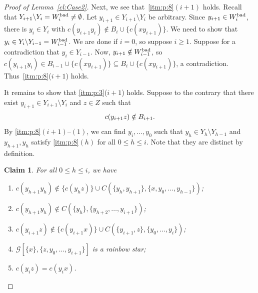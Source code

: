 \documentclass[a4paper, 12pt]{article}
\numberwithin{equation}{section}
\newtheorem{claim}[theorem]{Claim}
\def\sm{{\setminus}}
\newcommand{\ms}[1]{\mathscr{#1}}
\begin{document}
\begin{proof}[Proof of Lemma~\ref{cl:Case2}]
Next, we see that~\ref{itm:p:8}$(i+1)$ holds.
Recall that $Y_{i+1} \sm Y_i = W^{\rm bad}_i \neq \emptyset$. Let $y_{i+1} \in Y_{i+1}\sm Y_i$ be arbitrary.
Since $y_{i+1} \in W^{\rm bad}_i$, there is $y_i \in Y_i$ with $c(y_{i+1}y_i) \notin B_{i} \cup \{c(xy_{i+1})\}$.
We need to show that $y_i \in Y_i \sm Y_{i-1} = W^{\rm bad}_{i-1}$.
We are done if $i=0$, so suppose $i \geq 1$.
Suppose for a contradiction that $y_i \in Y_{i-1}$.
Now, $y_{i+1} \notin W^{\rm bad}_{i-1}$, so $c(y_{i+1}y_i) \in B_{i-1} \cup \{c(xy_{i+1})\} \subseteq B_{i} \cup \{c(xy_{i+1})\}$, a contradiction.
Thus~\ref{itm:p:8}($i+1$) holds.

It remains to show that \ref{itm:p:3}($i+1$) holds. 
Suppose to the contrary that there exist $y_{i+1} \in Y_{i+1} \sm Y_i$ and $z \in Z$ such that 
\begin{align}
c(y_{i+1} z ) \notin B_{{i+1}}. \label{eqn:c(y_{i+1} z)}
\end{align}
By \ref{itm:p:8}$(i+1)$--$(1)$, we can find $y_i, \dots, y_0$ such that $y_h\in Y_h\setminus Y_{h-1}$ and $y_{h+1},y_{h}$ satisfy \ref{itm:p:8}$(h)$ for all $0 \le h \le i$. 
Note that they are distinct by definition.




\begin{claim} \label{clm:68}
For all $0 \le h \le i $, we have 
\begin{enumerate}[label = {$(\rm \roman*)$}]
\item\label{itm:P5} $c(y_{h+1}y_h) \notin \{c(y_h z)\} \cup C(\{y_h,y_{h+1}\}, \{ x,y_0, \dots, y_{h-1} \})$;


\item\label{itm:1-10-1} $c(y_{h+1}y_{h}) \notin C(\{y_{h}\}, \{y_{h+2}, \dots, y_{i+1}\})$;

\item\label{itm:i+1z} $c(y_{i+1}z) \notin \{ c(y_{i+1}x)\} \cup C(\{y_{i+1},z\}, \{ y_0, \dots, y_{i} \})$;

\item \label{itm:gen} $\ms{G}[\{x\}, \{z,y_0, \dots, y_{i+1} \}]$ is a rainbow star;

\item \label{itm:c(y_iz)} $c(y_iz) = c(y_i x)$.
\end{enumerate}
\end{claim}


\end{proof}
\end{document}
